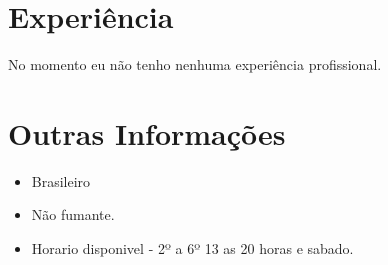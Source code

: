 \documentclass[]{twentysecondcv}
\begin{document}
\section{Experiência}

\begin{twenty}
No momento eu não tenho nenhuma experiência profissional. 

\end{twenty}
\vfill

\section{Outras Informações}
    \begin{itemize}
	\item Brasileiro
	\item Não fumante.
        	\item Horario disponivel - 2º a 6º 13 as 20 horas e sabado. 
    \end{itemize}    
\vfill
\end{document}
